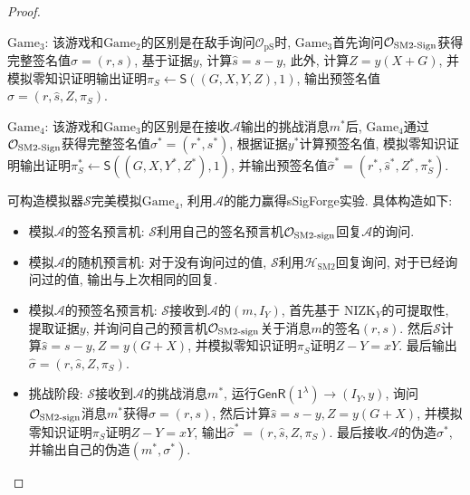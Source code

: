 \documentclass[review]{jcr}
\begin{document}
\begin{proof}
\begin{trivlist}
\item $\text{Game}_3$: 该游戏和$\text{Game}_2$的区别是在敌手询问$\mathcal{O}_{\text{pS}}$时, $\text{Game}_3$首先询问$\mathcal{O}_{\text{SM2\text{-}Sign}}$获得完整签名值$\sigma=(r,s)$, 基于证据$y$, 计算$\hat{s}=s-y$, 此外, 计算$Z=y(X+G)$, 并模拟零知识证明输出证明$\pi_S\leftarrow \mathsf{S}((G,X,Y,Z),1)$, 输出预签名值$\hat{\sigma}=(r,\hat{s},Z,\pi_S)$. 
\end{trivlist}

\begin{trivlist}
\item $\text{Game}_4$: 该游戏和$\text{Game}_3$的区别是在接收$\mathcal{A}$输出的挑战消息$m^*$后, $\text{Game}_4$通过$\mathcal{O}_{\text{SM2\text{-}Sign}}$获得完整签名值$\sigma^*=(r^*,s^*)$, 根据证据$y^*$计算预签名值, 模拟零知识证明输出证明$\pi_S^*\leftarrow \mathsf{S}((G,X,Y^*,Z^*),1)$, 并输出预签名值$\hat{\sigma}^*=(r^*,\hat{s}^*,Z^*,\pi_S^*)$. 
\end{trivlist}

可构造模拟器$\mathcal{S}$完美模拟$\text{Game}_4$, 利用$\mathcal{A}$的能力赢得sSigForge实验. 具体构造如下: 

\begin{itemize}
\item 模拟$\mathcal{A}$的签名预言机: $\mathcal{S}$利用自己的签名预言机$\mathcal{O}_{\text{SM2\text{-}sign}}$回复$\mathcal{A}$的询问. 

\item 模拟$\mathcal{A}$的随机预言机: 对于没有询问过的值, $\mathcal{S}$利用$\mathcal{H}_{\text{SM2}}$回复询问, 对于已经询问过的值, 输出与上次相同的回复. 

\item 模拟$\mathcal{A}$的预签名预言机: $\mathcal{S}$接收到$\mathcal{A}$的$(m, I_Y)$, 首先基于 NIZK$_Y$的可提取性, 提取证据$y$, 并询问自己的预言机$\mathcal{O}_{\text{SM2\text{-}sign}}$关于消息$m$的签名$(r, s)$. 然后$\mathcal{S}$计算$\hat{s} = s - y, Z=y(G+X)$, 并模拟零知识证明$\pi_S$证明$Z-Y=xY$. 最后输出$\hat{\sigma}=(r, \hat{s}, Z, \pi_S)$. 

\item 挑战阶段: $\mathcal{S}$接收到$\mathcal{A}$的挑战消息$m^*$, 运行$\mathsf{GenR}(1^\lambda)\rightarrow(I_Y,y)$, 询问$\mathcal{O}_{\text{SM2\text{-}sign}}$消息$m^*$获得$\sigma=(r, s)$, 然后计算$\hat{s} = s - y, Z=y(G+X)$, 并模拟零知识证明$\pi_S$证明$Z-Y=xY$, 输出$\hat{\sigma}^*=(r, \hat{s}, Z, \pi_S)$. 最后接收$\mathcal{A}$的伪造$\sigma^*$, 并输出自己的伪造$(m^*, \sigma^*)$. 
\end{itemize}


\end{proof}
\end{document}
